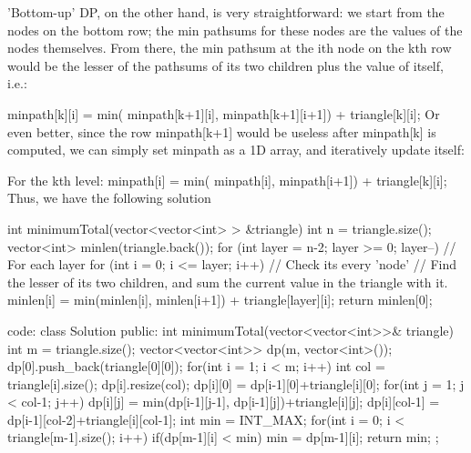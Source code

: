 'Bottom-up' DP, on the other hand, is very straightforward: we start from the nodes on the bottom row; the min pathsums for these nodes are the values of the nodes themselves. From there, the min pathsum at the ith node on the kth row would be the lesser of the pathsums of its two children plus the value of itself, i.e.:

minpath[k][i] = min( minpath[k+1][i], minpath[k+1][i+1]) + triangle[k][i];
Or even better, since the row minpath[k+1] would be useless after minpath[k] is computed, we can simply set minpath as a 1D array, and iteratively update itself:

For the kth level:
minpath[i] = min( minpath[i], minpath[i+1]) + triangle[k][i]; 
Thus, we have the following solution

int minimumTotal(vector<vector<int> > &triangle) {
    int n = triangle.size();
    vector<int> minlen(triangle.back());
    for (int layer = n-2; layer >= 0; layer--) // For each layer
    {
        for (int i = 0; i <= layer; i++) // Check its every 'node'
        {
            // Find the lesser of its two children, and sum the current value in the triangle with it.
            minlen[i] = min(minlen[i], minlen[i+1]) + triangle[layer][i]; 
        }
    }
    return minlen[0];
}





















code:
class Solution {
public:
    int minimumTotal(vector<vector<int>>& triangle) {
        int m = triangle.size();
        vector<vector<int>> dp(m, vector<int>());
        dp[0].push_back(triangle[0][0]);
        for(int i = 1; i < m; i++)
        {
            int col = triangle[i].size();
            dp[i].resize(col);
            dp[i][0] = dp[i-1][0]+triangle[i][0];
            for(int j = 1; j < col-1; j++)
            {
                dp[i][j] = min(dp[i-1][j-1], dp[i-1][j])+triangle[i][j];
            }
            dp[i][col-1] = dp[i-1][col-2]+triangle[i][col-1];
        }
        int min = INT_MAX;
        for(int i = 0; i < triangle[m-1].size(); i++)
        {
            if(dp[m-1][i] < min) min = dp[m-1][i];
        }
        return min;
    }
};